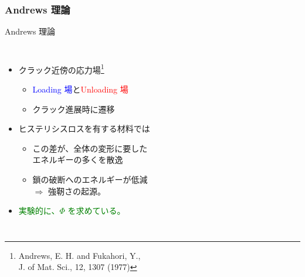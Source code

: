 \documentclass[unicode,12pt]{beamer}%
\begin{document}
\begin{frame}
	\frametitle{Andrews 理論}
	\vspace{-2mm}
	\begin{exampleblock}{Andrews 理論}
		\begin{columns}[totalwidth=1\textwidth]
			\begin{itemize}
			\item クラック近傍の応力場\footnote{
					Andrews, E. H. and Fukahori, Y., \\J. of Mat. Sci., 12, 1307 (1977)
					}
					\begin{itemize}
						\item \textcolor{blue}{Loading 場}と\textcolor{red}{Unloading 場}
						\item クラック進展時に遷移
					\end{itemize}
			\item ヒステリシスロスを有する材料では
				\begin{itemize}
				\item
				\alert{この差}が、全体の変形に要した\\エネルギーの多くを\alert{散逸}
				\item
			鎖の破断へのエネルギーが低減 \\$\Rightarrow$ \alert{強靭さの起源。}
				\end{itemize}	
			\item \textcolor{green}{実験的に、$\Phi$ を求めている。}
			\end{itemize}
		

\end{columns}
\end{exampleblock}
\end{frame}
\end{document}
